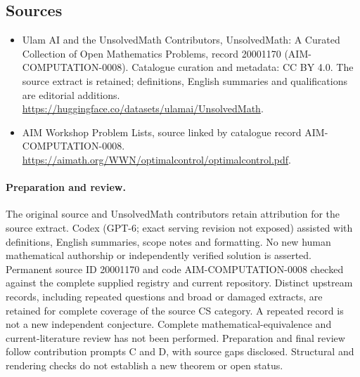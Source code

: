 \documentclass[11pt]{article}
\begin{document}
\subsection{Sources}
\begin{itemize}
\item[\hypertarget{source:20001170:1}{S1}] Ulam AI and the UnsolvedMath Contributors, UnsolvedMath: A Curated Collection of Open Mathematics Problems, record 20001170 (AIM-COMPUTATION-0008). Catalogue curation and metadata: CC BY 4.0. The source extract is retained; definitions, English summaries and qualifications are editorial additions.
\url{https://huggingface.co/datasets/ulamai/UnsolvedMath}.
\item[\hypertarget{source:20001170:2}{S2}] AIM Workshop Problem Lists, source linked by catalogue record AIM-COMPUTATION-0008.
\url{https://aimath.org/WWN/optimalcontrol/optimalcontrol.pdf}.
\end{itemize}
\paragraph{Preparation and review.}
The original source and UnsolvedMath contributors retain attribution for the source extract. Codex (GPT-6; exact serving revision not exposed) assisted with definitions, English summaries, scope notes and formatting. No new human mathematical authorship or independently verified solution is asserted. Permanent source ID 20001170 and code AIM-COMPUTATION-0008 checked against the complete supplied registry and current repository. Distinct upstream records, including repeated questions and broad or damaged extracts, are retained for complete coverage of the source CS category. A repeated record is not a new independent conjecture. Complete mathematical-equivalence and current-literature review has not been performed. Preparation and final review follow contribution prompts C and D, with source gaps disclosed. Structural and rendering checks do not establish a new theorem or open status.
\label{end:20001170}
\end{document}
